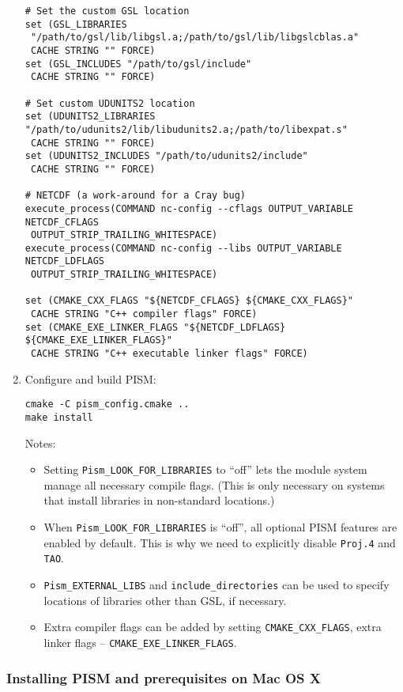 \documentclass[titlepage,letterpaper,final]{scrartcl}
\begin{document}
\begin{enumerate}
\begin{verbatim}
# Set the custom GSL location
set (GSL_LIBRARIES
 "/path/to/gsl/lib/libgsl.a;/path/to/gsl/lib/libgslcblas.a"
 CACHE STRING "" FORCE)
set (GSL_INCLUDES "/path/to/gsl/include"
 CACHE STRING "" FORCE)

# Set custom UDUNITS2 location
set (UDUNITS2_LIBRARIES "/path/to/udunits2/lib/libudunits2.a;/path/to/libexpat.s"
 CACHE STRING "" FORCE)
set (UDUNITS2_INCLUDES "/path/to/udunits2/include"
 CACHE STRING "" FORCE)

# NETCDF (a work-around for a Cray bug)
execute_process(COMMAND nc-config --cflags OUTPUT_VARIABLE NETCDF_CFLAGS
 OUTPUT_STRIP_TRAILING_WHITESPACE)
execute_process(COMMAND nc-config --libs OUTPUT_VARIABLE NETCDF_LDFLAGS
 OUTPUT_STRIP_TRAILING_WHITESPACE)

set (CMAKE_CXX_FLAGS "${NETCDF_CFLAGS} ${CMAKE_CXX_FLAGS}"
 CACHE STRING "C++ compiler flags" FORCE)
set (CMAKE_EXE_LINKER_FLAGS "${NETCDF_LDFLAGS} ${CMAKE_EXE_LINKER_FLAGS}"
 CACHE STRING "C++ executable linker flags" FORCE)
\end{verbatim}
\item Configure and build PISM:
\begin{verbatim}
cmake -C pism_config.cmake ..
make install
\end{verbatim}

Notes:
\begin{itemize}
\item Setting \texttt{Pism_LOOK_FOR_LIBRARIES} to ``off'' lets the module
  system manage all necessary compile flags. (This is only necessary on systems
  that install libraries in non-standard locations.)
\item When \texttt{Pism_LOOK_FOR_LIBRARIES} is ``off'', all optional PISM features are enabled by default. This is why we need to explicitly disable \texttt{Proj.4} and \texttt{TAO}.
\item \texttt{Pism_EXTERNAL_LIBS} and \texttt{include_directories} can be used to specify locations of libraries other than GSL, if necessary.
\item Extra compiler flags can be added by setting \texttt{CMAKE_CXX_FLAGS}, extra linker flags -- \mbox{\texttt{CMAKE_EXE_LINKER_FLAGS}}.
\end{itemize}
\end{enumerate}

\subsubsection{Installing PISM and prerequisites on Mac OS X}  \label{subsec:macosx}
\end{document}
